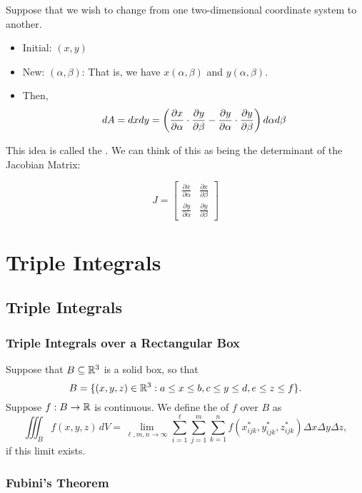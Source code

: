 Suppose that we wish to change from one two-dimensional coordinate system to another.

\begin{itemize}
  \item Initial: \((x, y)\)
  \item New: \((\alpha, \beta)\): That is, we have \(x(\alpha, \beta)\) and \(y(\alpha, \beta)\).
  \item Then, 
  \[
    dA = dxdy = \left(\frac{\partial x}{\partial \alpha} \cdot \frac{\partial y}{\partial \beta} - \frac{\partial y}{\partial \alpha} \cdot \frac{\partial y}{\partial \beta}\right) d\alpha d\beta
  \]
\end{itemize}

This idea is called the . We can think of this as being the determinant of the Jacobian Matrix:

\[
  J = \begin{bmatrix} \frac{\partial x}{\partial \alpha} & \frac{\partial x}{\partial \beta} \\ \frac{\partial y}{\partial \alpha} & \frac{\partial y}{\partial \beta} \end{bmatrix}
\]

\newpage

\section{Triple Integrals}

\subsection{Triple Integrals}

\subsubsection{Triple Integrals over a Rectangular Box}

Suppose that \(B \subseteq \mathbb{R}^3\) is a solid box, so that
\[
  B = \{(x, y, z) \in \mathbb{R}^3 : a \leq x \leq b, c \leq y \leq d, e \leq z \leq f\}.
\]
Suppose \(f : B \to \mathbb{R}\) is continuous. We define the  of \(f\) over \(B\) as
\[
  \iiint_B f(x, y, z) \, dV = \lim_{\ell, m, n \to \infty} \sum_{i=1}^{\ell} \sum_{j=1}^{m} \sum_{k=1}^{n} f(x^*_{ijk}, y^*_{ijk}, z^*_{ijk}) \Delta x \Delta y \Delta z,
\]
if this limit exists.

\subsubsection{Fubini’s Theorem}

